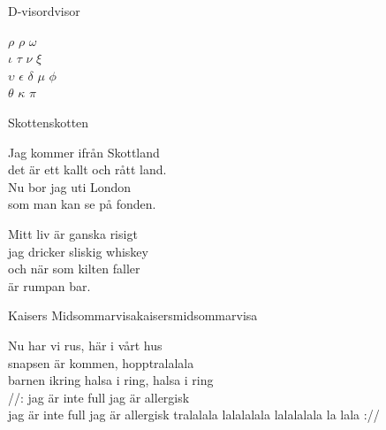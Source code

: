 \begin{song}{D-visor}{dvisor}
\begin{vers}
$\rho$ $\rho$ $\omega$ \\
$\iota$ $\tau$ $\nu$ $\xi$\\
$\upsilon$ $\epsilon$ $\delta$ $\mu$ $\phi$\\
$\theta$ $\kappa$ $\pi$\\
\end{vers}
\end{song}

\begin{song}{Skotten}{skotten}
\begin{vers}
Jag kommer ifrån Skottland\\
det är ett kallt och rått land.\\
Nu bor jag uti London\\
som man kan se på fonden.\\
\end{vers}
\begin{vers}
Mitt liv är ganska risigt\\
jag dricker sliskig whiskey\\
och när som kilten faller\\
är rumpan bar.\\
\end{vers}
\end{song}


\begin{song}{Kaisers Midsommarvisa}{kaisersmidsommarvisa}
\begin{vers}
Nu har vi rus, här i vårt hus\\
snapsen är kommen, hopptralalala\\
barnen ikring halsa i ring, halsa i ring\\
//: jag är inte full jag är allergisk\\
jag är inte full jag är allergisk
tralalala lalalalala lalalalala la lala ://\\
\end{vers}
\end{song} 

\newpage

